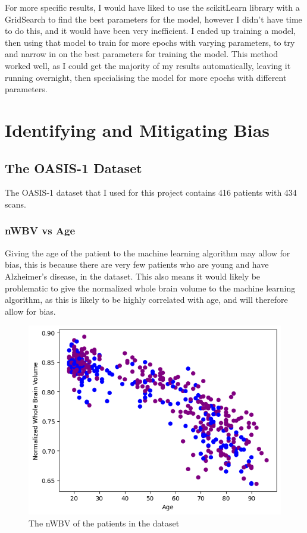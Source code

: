 \documentclass[]{final_report}
\begin{document}
For more specific results, I would have liked to use the scikitLearn library with a GridSearch to find the best parameters for the model, however I didn't have time to do this, and it would have been very inefficient.
I ended up training a model, then using that model to train for more epochs with varying parameters, to try and narrow in on the best parameters for training the model.
This method worked well, as I could get the majority of my results automatically, leaving it running overnight, then specialising the model for more epochs with different parameters.

\chapter{Identifying and Mitigating Bias}

\section{The OASIS-1 Dataset}
The OASIS-1 dataset\cite{OASIS} that I used for this project contains 416 patients with 434 scans.

\subsection{nWBV vs Age}
Giving the age of the patient to the machine learning algorithm may allow for bias, this is because there are very few patients who are young and have Alzheimer's disease, in the dataset.
This also means it would likely be problematic to give the normalized whole brain volume to the machine learning algorithm, as this is likely to be highly correlated with age, and will therefore allow for bias.

\begin{figure}[h]
  \centering
  \includegraphics[width=1\textwidth]{images/nWBV-vs-Age.png}
  \caption{The nWBV of the patients in the dataset}
  \label{fig:nWBV-vs-Age}
\end{figure}
\end{document}
